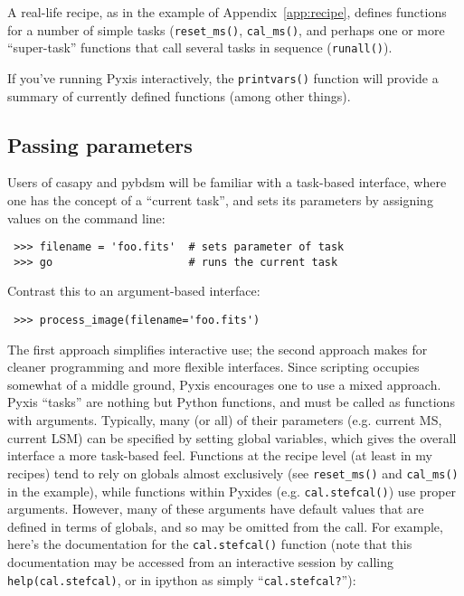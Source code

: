 \documentclass[a4paper,10pt]{article}
\begin{document}
A real-life recipe, as in the example of Appendix~\ref{app:recipe}, defines functions for a number of simple tasks ({\tt reset\_ms()}, {\tt cal\_ms()}, and perhaps one or more ``super-task'' functions that call several tasks in sequence ({\tt runall()}). 

If you've running Pyxis interactively, the {\tt printvars()} function will provide a summary of currently defined functions (among other things).


\subsection{Passing parameters}

Users of casapy and pybdsm will be familiar with a task-based interface, where one has the concept of a ``current task'', and sets its parameters by assigning values on the command line:

\begin{verbatim}
 >>> filename = 'foo.fits'  # sets parameter of task
 >>> go                     # runs the current task
\end{verbatim}

Contrast this to an argument-based interface:

\begin{verbatim}
 >>> process_image(filename='foo.fits')
\end{verbatim}

The first approach simplifies interactive use; the second approach makes for cleaner programming and more flexible interfaces. Since scripting occupies somewhat of a middle ground, Pyxis encourages one to use a mixed approach. Pyxis ``tasks'' are nothing but Python functions, and must be called as functions with arguments. Typically, many (or all) of their parameters (e.g. current MS, current LSM) can be specified by setting global variables, which gives the overall interface a more task-based feel. Functions at the recipe level (at least in my recipes) tend to rely on globals almost exclusively (see {\tt reset\_ms()} and {\tt cal\_ms()} in the example), while functions within Pyxides (e.g. {\tt cal.stefcal()}) use proper arguments. However, many of these arguments have default values that are defined in terms of globals, and so may be omitted from the call. For example, here's the documentation for the {\tt cal.stefcal()} function (note that this documentation may be accessed from an interactive session by calling {\tt help(cal.stefcal)}, or in ipython as simply ``{\tt cal.stefcal?}''):
\end{document}

